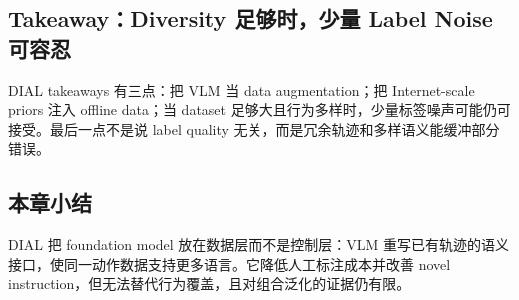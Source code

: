 \subsection{Takeaway：Diversity 足够时，少量 Label Noise 可容忍}

DIAL takeaways 有三点：把 VLM 当 data augmentation；把 Internet-scale priors 注入 offline data；当 dataset 足够大且行为多样时，少量标签噪声可能仍可接受。最后一点不是说 label quality 无关，而是冗余轨迹和多样语义能缓冲部分错误。



\subsection{本章小结}

DIAL 把 foundation model 放在数据层而不是控制层：VLM 重写已有轨迹的语义接口，使同一动作数据支持更多语言。它降低人工标注成本并改善 novel instruction，但无法替代行为覆盖，且对组合泛化的证据仍有限。

